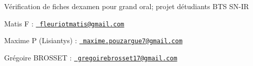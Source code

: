 Vérification de fiches d\textquotesingle{}examen pour grand oral; projet d\textquotesingle{}étudiants BTS SN-\/\+IR

Matis F \+: \href{mailto:fleuriotmatis@gmail.com}{\texttt{ fleuriotmatis@gmail.\+com}}

Maxime P (Lisiantys) \+: \href{mailto:maxime.pouzargue7@gmail.com}{\texttt{ maxime.\+pouzargue7@gmail.\+com}}

Grégoire BROSSET \+: \href{mailto:gregoirebrosset17@gmail.com}{\texttt{ gregoirebrosset17@gmail.\+com}} 